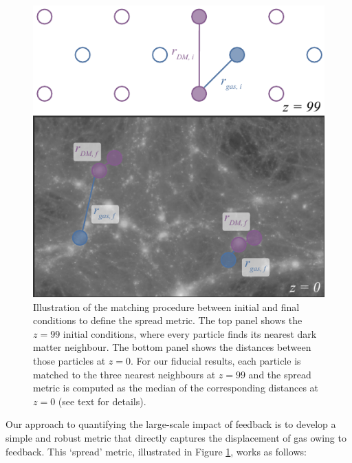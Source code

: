 \begin{figure}
    \centering
    \includegraphics[width=\columnwidth]{figures/kspafig_small.pdf}
    \vspace{-0.5cm}
    \caption{Illustration of the matching procedure between initial and final conditions to define the spread metric. The top panel shows the $z=99$ initial conditions, where
    every particle finds its nearest dark matter neighbour. The bottom
    panel shows the distances between those particles at $z=0$. For our
    fiducial results, each particle is matched to the three nearest 
    neighbours at $z=99$ and the spread metric is computed as the median 
    of the corresponding distances at $z=0$ (see text for details). 
    }
    \vspace{-0.5cm}
    \label{fig:kspafigsmall}
\end{figure}

Our approach to quantifying the large-scale impact of feedback is to develop
a simple and robust metric that directly captures the displacement of gas
owing to feedback. This `spread' metric, illustrated in Figure
\ref{fig:kspafigsmall}, works as follows:

